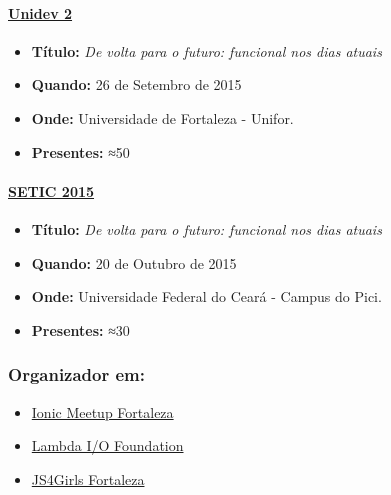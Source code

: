 \documentclass[]{article}
\providecommand{\tightlist}{%
  \setlength{\itemsep}{0pt}\setlength{\parskip}{0pt}}
\let\oldparagraph\paragraph
\renewcommand{\paragraph}[1]{\oldparagraph{#1}\mbox{}}
\begin{document}
\paragraph{\texorpdfstring{\href{http://unidevce.github.io/}{Unidev
2}}{Unidev 2}}\label{unidev-2}

\begin{itemize}
\tightlist
\item
  \textbf{Título:} \emph{De volta para o futuro: funcional nos dias
  atuais}
\item
  \textbf{Quando:} 26 de Setembro de 2015
\item
  \textbf{Onde:} Universidade de Fortaleza - Unifor.
\item
  \textbf{Presentes:} ≈50
\end{itemize}

\paragraph{\texorpdfstring{\href{http://www.seti.ufc.br/}{SETIC
2015}}{SETIC 2015}}\label{setic-2015}

\begin{itemize}
\tightlist
\item
  \textbf{Título:} \emph{De volta para o futuro: funcional nos dias
  atuais}
\item
  \textbf{Quando:} 20 de Outubro de 2015
\item
  \textbf{Onde:} Universidade Federal do Ceará - Campus do Pici.
\item
  \textbf{Presentes:} ≈30
\end{itemize}

\subsubsection{Organizador em:}\label{organizador-em}

\begin{itemize}
\tightlist
\item
  \href{http://ionicbrazil.com/}{Ionic Meetup Fortaleza}
\item
  \href{https://github.com/lambda-io}{Lambda I/O Foundation}
\item
  \href{http://js4girls-fortaleza.github.io/}{JS4Girls Fortaleza}
\end{itemize}
\end{document}
